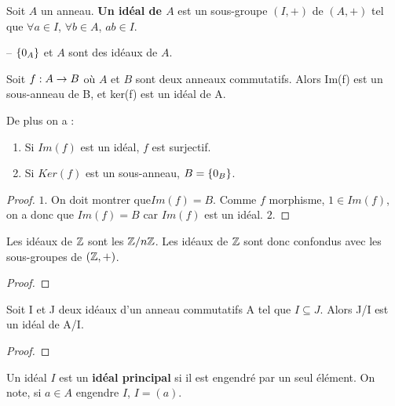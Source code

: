 \begin{definition}
	Soit $A$ un anneau. \textbf{Un idéal de $A$} est un sous-groupe $(I, +)$ de
	$(A, +)$ tel que $\forall a \in I$, $\forall b \in A$, $ab \in I$.
\end{definition}

\begin{exemple}
	-- $\left\{ 0_{A} \right\}$ et $A$ sont des idéaux de $A$.
\end{exemple}

\begin{proposition}
	Soit $f : A \rightarrow B$ où $A$ et $B$ sont deux anneaux commutatifs. Alors
	Im(f) est un sous-anneau de B, et ker(f) est un idéal de A.

	De plus on a :
	\begin{enumerate}
		\item Si $Im(f)$ est un idéal, $f$ est surjectif.
		\item Si $Ker(f)$ est un sous-anneau, $B = \left\{ 0_{B} \right\}$.
	\end{enumerate}
\end{proposition}

\ifdefined\outputproof
\begin{proof}
	$1$. On doit montrer que$ Im(f) = B$. Comme $f$ morphisme, $1 \in Im(f)$, on a
	donc que $Im(f) = B$ car $Im(f)$ est un idéal.
	$2$.
\end{proof}
\fi

\begin{proposition}
	Les idéaux de $\mathbb{Z}$ sont les $\mathbb{Z}/n\mathbb{Z}$. Les idéaux de
	$\mathbb{Z}$ sont donc confondus avec les sous-groupes de $(\mathbb{Z}, +)$.
\end{proposition}

\ifdefined\outputproof
\begin{proof}

\end{proof}
\fi

\begin{proposition}
	Soit I et J deux idéaux d'un anneau commutatifs A tel que $I \subseteq J$.
	Alors J/I est un idéal de A/I.
\end{proposition}

\ifdefined\outputproof
\begin{proof}

\end{proof}
\fi

\begin{definition} 
	\label{def:principal_ideal}
	Un idéal $I$ est un \textbf{idéal principal} si il est engendré par un seul
	élément. On note, si $a \in A$ engendre $I$, $I = (a)$.
\end{definition}

